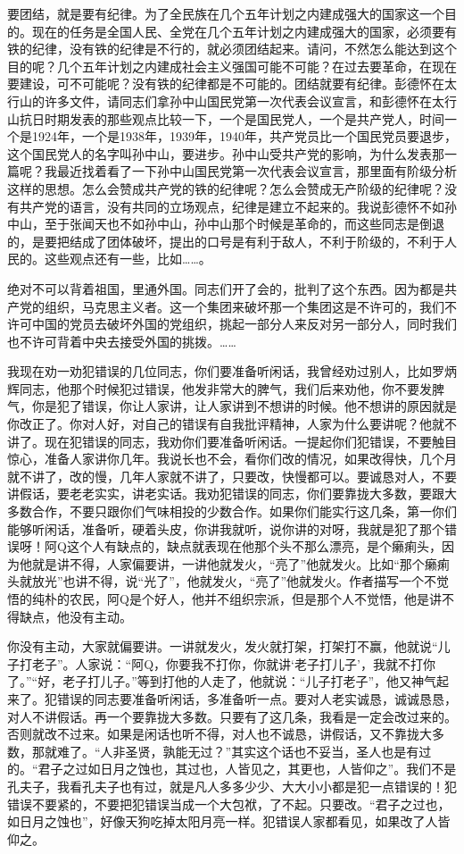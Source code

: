 要团结，就是要有纪律。为了全民族在几个五年计划之内建成强大的国家这一个目的。现在的任务是全国人民、全党在几个五年计划之内建成强大的国家，必须要有铁的纪律，没有铁的纪律是不行的，就必须团结起来。请问，不然怎么能达到这个目的呢？几个五年计划之内建成社会主义强国可能不可能？在过去要革命，在现在要建设，可不可能呢？没有铁的纪律都是不可能的。团结就要有纪律。彭德怀在太行山的许多文件，请同志们拿孙中山国民党第一次代表会议宣言，和彭德怀在太行山抗日时期发表的那些观点比较一下，一个是国民党人，一个是共产党人，时间一个是1924年，一个是1938年，1939年，1940年，共产党员比一个国民党员要退步，这个国民党人的名字叫孙中山，要进步。孙中山受共产党的影响，为什么发表那一篇呢？我最近找着看了一下孙中山国民党第一次代表会议宣言，那里面有阶级分析这样的思想。怎么会赞成共产党的铁的纪律呢？怎么会赞成无产阶级的纪律呢？没有共产党的语言，没有共同的立场观点，纪律是建立不起来的。我说彭德怀不如孙中山，至于张闻天也不如孙中山，孙中山那个时候是革命的，而这些同志是倒退的，是要把结成了团体破坏，提出的口号是有利于敌人，不利于阶级的，不利于人民的。这些观点还有一些，比如……。

绝对不可以背着祖国，里通外国。同志们开了会的，批判了这个东西。因为都是共产党的组织，马克思主义者。这一个集团来破坏那一个集团这是不许可的，我们不许可中国的党员去破坏外国的党组织，挑起一部分人来反对另一部分人，同时我们也不许可背着中央去接受外国的挑拨。……

我现在劝一劝犯错误的几位同志，你们要准备听闲话，我曾经劝过别人，比如罗炳辉同志，他那个时候犯过错误，他发非常大的脾气，我们后来劝他，你不要发脾气，你是犯了错误，你让人家讲，让人家讲到不想讲的时候。他不想讲的原因就是你改正了。你对人好，对自己的错误有自我批评精神，人家为什么要讲呢？他就不讲了。现在犯错误的同志，我劝你们要准备听闲话。一提起你们犯错误，不要触目惊心，准备人家讲你几年。我说长也不会，看你们改的情况，如果改得快，几个月就不讲了，改的慢，几年人家就不讲了，只要改，快慢都可以。要诚恳对人，不要讲假话，要老老实实，讲老实话。我劝犯错误的同志，你们要靠拢大多数，要跟大多数合作，不要只跟你们气味相投的少数合作。如果你们能实行这几条，第一你们能够听闲话，准备听，硬着头皮，你讲我就听，说你讲的对呀，我就是犯了那个错误呀！阿Q这个人有缺点的，缺点就表现在他那个头不那么漂亮，是个癞痢头，因为他就是讲不得，人家偏要讲，一讲他就发火，“亮了”他就发火。比如“那个癞痢头就放光”也讲不得，说“光了”，他就发火，“亮了”他就发火。作者描写一个不觉悟的纯朴的农民，阿Q是个好人，他并不组织宗派，但是那个人不觉悟，他是讲不得缺点，他没有主动。

你没有主动，大家就偏要讲。一讲就发火，发火就打架，打架打不赢，他就说“儿子打老子”。人家说：“阿Q，你要我不打你，你就讲‘老子打儿子’，我就不打你了。”“好，老子打儿子。”等到打他的人走了，他就说：“儿子打老子”，他又神气起来了。犯错误的同志要准备听闲话，多准备听一点。要对人老实诚恳，诚诚恳恳，对人不讲假话。再一个要靠拢大多数。只要有了这几条，我看是一定会改过来的。否则就改不过来。如果是闲话也听不得，对人也不诚恳，讲假话，又不靠拢大多数，那就难了。“人非圣贤，孰能无过？”其实这个话也不妥当，圣人也是有过的。“君子之过如日月之蚀也，其过也，人皆见之，其更也，人皆仰之”。我们不是孔夫子，我看孔夫子也有过，就是凡人多多少少、大大小小都是犯一点错误的！犯错误不要紧的，不要把犯错误当成一个大包袱，了不起。只要改。“君子之过也，如日月之蚀也”，好像天狗吃掉太阳月亮一样。犯错误人家都看见，如果改了人皆仰之。

